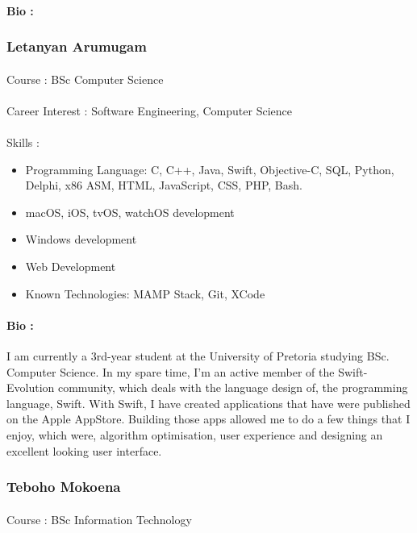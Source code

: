 \documentclass[11pt]{article}
\begin{document}
\paragraph{Bio :} 
\subsubsection{Letanyan Arumugam}
\paragraph{}Course : BSc Computer Science 
\paragraph{}Career Interest : Software Engineering, Computer Science
\paragraph{}Skills :
\begin{itemize}

\item Programming Language: C, C++, Java, Swift, Objective-C, SQL, Python, Delphi, x86 ASM, HTML, JavaScript, CSS, PHP, Bash.
\item macOS, iOS, tvOS, watchOS development
\item Windows development 
\item Web Development
\item Known Technologies: MAMP Stack, Git, XCode
\end{itemize}
\paragraph{Bio :}I am currently a 3rd-year student at the University of Pretoria studying BSc. Computer Science. In my spare time, I'm an active member of the Swift-Evolution community, which deals with the language design of, the programming language, Swift. With Swift, I have created applications that have were published on the Apple AppStore. Building those apps allowed me to do a few things that I enjoy, which were, algorithm optimisation, user experience and designing an excellent looking user interface.

\subsubsection{Teboho Mokoena}
\paragraph{}Course : BSc Information Technology 
\end{document}
